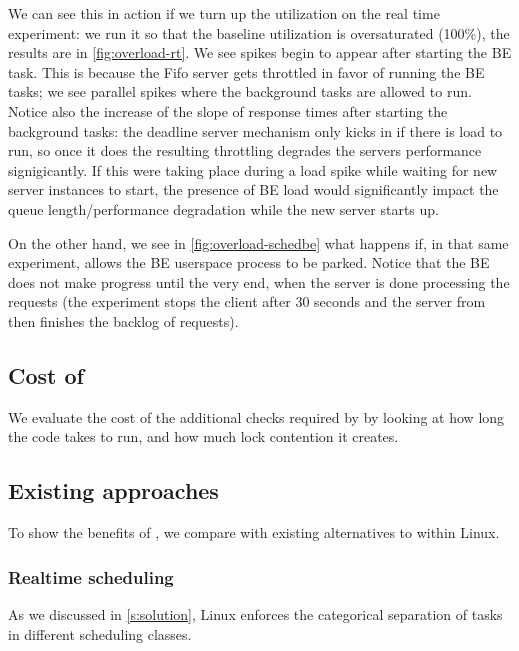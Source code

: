 We can see this in action if we turn up the utilization on the real time
experiment: we run it so that the baseline utilization is oversaturated (100\%),
the results are in \autoref{fig:overload-rt}. We see spikes begin to
appear after starting the BE task. This is because the Fifo server gets
throttled in favor of running the BE tasks; we see parallel spikes where the
background tasks are allowed to run. Notice also the increase of the slope of
response times after starting the background tasks: the deadline server
mechanism only kicks in if there is load to run, so once it does the resulting
throttling degrades the servers performance signigicantly. If this were taking
place during a load spike while waiting for new server instances to start, the
presence of BE load would significantly impact the queue length/performance
degradation while the new server starts up.

On the other hand, we see in \autoref{fig:overload-schedbe} what happens
if, in that same experiment, \schedbe{} allows the BE userspace process to be
parked. Notice that the BE does not make progress until the very end, when the
server is done processing the requests (the experiment stops the client after 30
seconds and the server from then finishes the backlog of requests).



\subsection{Cost of \schedbe{}}

We evaluate the cost of the additional checks required by \schedbe{} by looking
at how long the code takes to run, and how much lock contention it creates.




\subsection{Existing approaches}\label{ss:eval:existing}

To show the benefits of \schedbe{}, we compare with existing alternatives to
\cgroups{} within Linux.

\subsubsection{Realtime scheduling}

As we discussed in \autoref{s:solution}, Linux enforces the categorical
separation of tasks in different scheduling classes. 

